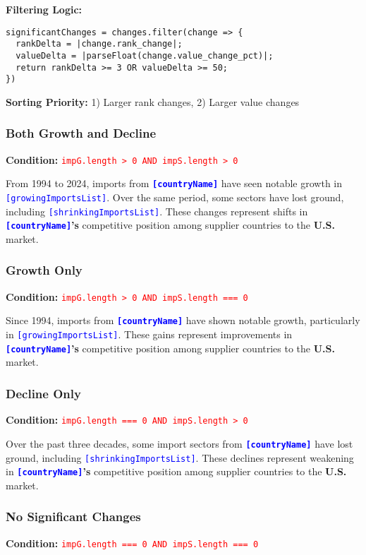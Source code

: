 \documentclass[12pt]{article}
\newcommand{\var}[1]{\textcolor{blue}{\texttt{[#1]}}}
\newcommand{\bold}[1]{\textbf{#1}}
\newcommand{\cond}[1]{\textcolor{red}{\texttt{#1}}}
\begin{document}
\textbf{Filtering Logic:} 
\begin{Verbatim}[fontsize=\small]
significantChanges = changes.filter(change => {
  rankDelta = |change.rank_change|;
  valueDelta = |parseFloat(change.value_change_pct)|;
  return rankDelta >= 3 OR valueDelta >= 50;
})
\end{Verbatim}

\textbf{Sorting Priority:} 1) Larger rank changes, 2) Larger value changes

\subsubsection{Both Growth and Decline}
\textbf{Condition:} \cond{impG.length > 0 AND impS.length > 0}

From 1994 to 2024, imports from \bold{\var{countryName}} have seen notable growth in \var{growingImportsList}. Over the same period, some sectors have lost ground, including \var{shrinkingImportsList}. These changes represent shifts in \bold{\var{countryName}'s} competitive position among supplier countries to the \bold{U.S.} market.

\subsubsection{Growth Only}
\textbf{Condition:} \cond{impG.length > 0 AND impS.length === 0}

Since 1994, imports from \bold{\var{countryName}} have shown notable growth, particularly in \var{growingImportsList}. These gains represent improvements in \bold{\var{countryName}'s} competitive position among supplier countries to the \bold{U.S.} market.

\subsubsection{Decline Only}
\textbf{Condition:} \cond{impG.length === 0 AND impS.length > 0}

Over the past three decades, some import sectors from \bold{\var{countryName}} have lost ground, including \var{shrinkingImportsList}. These declines represent weakening in \bold{\var{countryName}'s} competitive position among supplier countries to the \bold{U.S.} market.

\subsubsection{No Significant Changes}
\textbf{Condition:} \cond{impG.length === 0 AND impS.length === 0}
\end{document}

